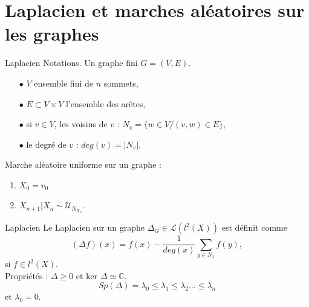 \begin{frame}
  \titlepage
\end{frame}

\section{Laplacien et marches aléatoires sur les graphes}

\begin{frame}{Laplacien}
Notations. Un graphe fini $G=(V,E)$.
 
\begin{itemize}
\item[$\bullet$] $V$ ensemble fini de $n$ sommets,
\item[$\bullet$] $E\subset V\times V$ l'ensemble des arêtes,
\item[$\bullet$] si $v\in V$, les voisins de $v$ : $N_v=\{w\in V / (v,w)\in E\}$,
\item[$\bullet$] le degré de $v$ : $deg(v)=|N_v|$.
\end{itemize}
Marche aléatoire uniforme sur un graphe :
\begin{enumerate}
\item $X_0=v_0$
\item $X_{n+1}|X_n\sim \mathcal U_{N_{X_n}}$. \\
\end{enumerate}
\end{frame}

\begin{frame}{Laplacien}
Le Laplacien sur un graphe $\Delta_G\in \mathcal L(l^2(X))$ est définit comme
\[(\Delta f) (x) = f(x) - \frac{1}{deg(x)}\sum_{y\in N_x} f(y) ,\]
si $f\in l^2(X)$.\\

Propriétés : $\Delta\geq 0$ et $\text{ker }\Delta\simeq \mathbb C $.\\

\[Sp(\Delta)= \lambda_0\leq \lambda_1\leq \lambda_2...\leq \lambda_n\]
et $\lambda_0=0$.
\end{frame}







